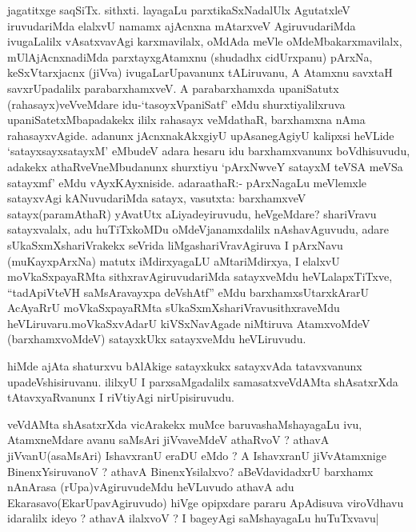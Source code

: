 

\begin{artha}
jagatitxge saqSiTx. sithxti. layagaLu parxtikaSxNadalUlx AgutatxleV
iruvudariMda elalxvU namamx ajAcnxna mAtarxveV AgiruvudariMda
ivugaLalilx vAsatxvavAgi karxmavilalx, oMdAda meVle
oMdeMbakarxmavilalx, mUlAjAcnxnadiMda parxtayxgAtamxnu (shudadhx
cidUrxpanu) pArxNa, keSxVtarxjacnx (jiVva) ivugaLarUpavanunx
tALiruvanu, A Atamxnu savxtaH savxrUpadalilx parabarxhamxveV. A
parabarxhamxda upaniSatutx (rahasayx)veVveMdare idu-`tasoyxVpaniSatf'
eMdu shurxtiyalilxruva upaniSatetxMbapadakekx ililx rahasayx veMdathaR,
barxhamxna nAma rahasayxvAgide. adanunx jAcnxnakAkxgiyU upAsanegAgiyU
kalipxsi heVLide `satayxsayxsatayxM' eMbudeV adara hesaru  idu
barxhamxvanunx boVdhisuvudu, adakekx athaRveVneMbudanunx shurxtiyu
`pArxNwveY satayxM teVSA meVSa satayxmf' eMdu
vAyxKAyxniside. adaraathaR:- pArxNagaLu meVlemxle satayxvAgi
kANuvudariMda satayx, vasutxta: barxhamxveV satayx(paramAthaR)
yAvatUtx aLiyadeyiruvudu, heVgeMdare? shariVravu satayxvalalx, adu
huTiTxkoMDu oMdeVjanamxdalilx nAshavAguvudu, adare
sUkaSxmXshariVrakekx seVrida liMgashariVravAgiruva I pArxNavu
(muKayxpArxNa) matutx iMdirxyagaLU aMtariMdirxya, I elalxvU
moVkaSxpayaRMta sithxravAgiruvudariMda satayxveMdu heVLalapxTiTxve,
``tadApiVteVH saMsAravayxpa deVshAtf'' eMdu
barxhamxsUtarxkArarU AcAyaRrU moVkaSxpayaRMta
sUkaSxmXshariVravusithxraveMdu heVLiruvaru.moVkaSxvAdarU kiVSxNavAgade
niMtiruva AtamxvoMdeV (barxhamxvoMdeV) satayxkUkx satayxveMdu
heVLiruvudu.  
\end{artha}

\begin{artha}
hiMde ajAta shaturxvu bAlAkige satayxkukx satayxvAda tatavxvanunx
upadeVshisiruvanu. ililxyU I parxsaMgadalilx samasatxveVdAMta
shAsatxrXda tAtavxyaRvanunx I riVtiyAgi nirUpisiruvudu.
\end{artha}



\begin{artha}
veVdAMta shAsatxrXda vicArakekx muMce baruvashaMshayagaLu ivu,
AtamxneMdare avanu saMsAri jiVvaveMdeV athaRvoV ? athavA
jiVvanU(asaMsAri) IshavxranU eraDU eMdo ? A IshavxranU jiVvAtamxnige
BinenxYsiruvanoV ? athavA BinenxYsilalxvo? aBeVdavidadxrU barxhamx
nAnArasa (rUpa)vAgiruvudeMdu heVLuvudo athavA adu
Ekarasavo(EkarUpavAgiruvudo) hiVge opipxdare pararu ApAdisuva
viroVdhavu idaralilx ideyo ? athavA ilalxvoV ? I bageyAgi saMshayagaLu huTuTxvavu|
\end{artha}

